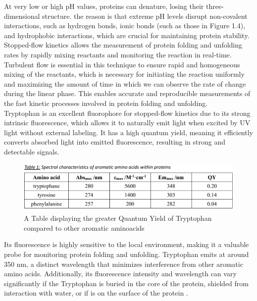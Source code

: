 \documentclass[a4paper,english,12pt,bibliography=totoc]{scrreprt}
\begin{document}
At very low or high pH values, proteins can denature, losing their three-dimensional structure. the reason is that extreme pH levels disrupt non-covalent interactions, such as hydrogen bonds, ionic bonds (such as those in Figure 1.4), and hydrophobic interactions, which are crucial for maintaining protein stability.\\

Stopped-flow kinetics allows the measurement of protein folding and unfolding rates by rapidly mixing reactants and monitoring the reaction in real-time. Turbulent flow is essential in this technique to ensure rapid and homogeneous mixing of the reactants, which is necessary for initiating the reaction uniformly and maximizing the amount of time in which we can observe the rate of change during the linear phase. This enables accurate and reproducible measurements of the fast kinetic processes involved in protein folding and unfolding.\\

Tryptophan is an excellent fluorophore for stopped-flow kinetics due to its strong intrinsic fluorescence, which allows it to naturally emit light when excited by UV light without external labeling. It has a high quantum yield, meaning it efficiently converts absorbed light into emitted fluorescence, resulting in strong and detectable signals.
\begin{figure}[H]
    \centering
    \includegraphics[width=0.9\linewidth]{tryptophanQY.png}
    \caption{A Table displaying the greater Quantum Yield of Tryptophan compared to other aromatic aminoacids \cite{BiophysicsLabCourse}}
\end{figure}
Its fluorescence is highly sensitive to the local environment, making it a valuable probe for monitoring protein folding and unfolding. Tryptophan emits at around 350 nm, a distinct wavelength that minimizes interference from other aromatic amino acids. Additionally, its fluorescence intensity and wavelength can vary significantly if the Tryptophan is buried in the core of the protein, shielded from interaction with water, or if is on the surface of the protein .
\end{document}
